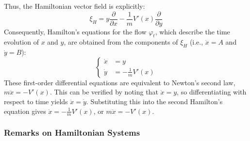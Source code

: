 Thus, the Hamiltonian vector field is explicitly:
\[
\xi_H = y \frac{\partial}{\partial x} - \frac{1}{m}V'(x) \frac{\partial}{\partial y} 
\]
Consequently, Hamilton's equations for the flow $\varphi_t$, which describe the time evolution of $x$ and $y$, are obtained from the components of $\xi_H$ (i.e., $\dot{x} = A$ and $\dot{y} = B$):
\[
\left\{
\begin{aligned}
\dot{x} &= y \\
\dot{y} &= -\frac{1}{m}V'(x)
\end{aligned}
\right.
\]
These first-order differential equations are equivalent to Newton's second law, $m\ddot{x} = -V'(x)$. This can be verified by noting that $\dot{x}=y$, so differentiating with respect to time yields $\ddot{x}=\dot{y}$. Substituting this into the second Hamilton's equation gives $\ddot{x} = -\frac{1}{m}V'(x)$, or $m\ddot{x} = -V'(x)$.

\subsubsection{Remarks on Hamiltonian Systems}

